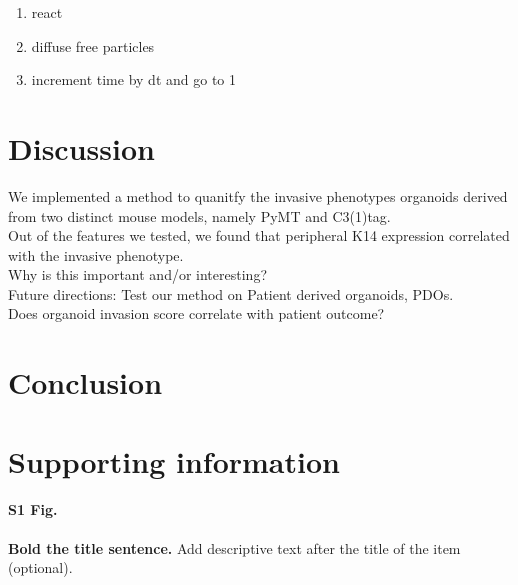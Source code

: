 \documentclass[10pt,letterpaper]{article}
\begin{document}
\begin{enumerate}
	\item{react}
	\item{diffuse free particles}
	\item{increment time by dt and go to 1}
\end{enumerate}


\section*{Discussion}

We implemented a method to quanitfy the invasive phenotypes organoids derived from two distinct mouse models, namely PyMT and C3(1)tag.\\
Out of the features we tested, we found that peripheral K14 expression correlated with the invasive phenotype.\\
Why is this important and/or interesting?\\
Future directions: Test our method on Patient derived organoids, PDOs.\\
Does organoid invasion score correlate with patient outcome?

\section*{Conclusion}


\section*{Supporting information}

\paragraph*{S1 Fig.}
\label{S1_Fig}
{\bf Bold the title sentence.} Add descriptive text after the title of the item (optional).
\end{document}
